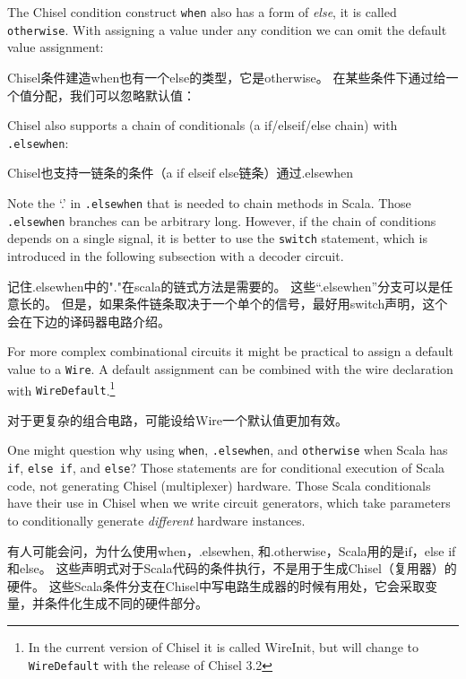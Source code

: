 \documentclass[%
    10pt,
    headinclude, footexclude,
    openright, %
    notitlepage,
    cleardoubleempty,
    headsepline,
    pointlessnumbers,
    bibtotoc, idxtotoc,
    ]{scrbook}
\newcommand{\code}[1]{{\small{\texttt{#1}}}}
\begin{document}
The Chisel condition construct \code{when} also has a form of \emph{else}, it is called
\code{otherwise}. With assigning a value under any condition we can omit the default
value assignment:

Chisel条件建造when也有一个else的类型，它是otherwise。
在某些条件下通过给一个值分配，我们可以忽略默认值：


Chisel also supports a chain of conditionals (a if/elseif/else chain) with \code{.elsewhen}:

Chisel也支持一链条的条件（a if elseif else链条）通过.elsewhen


Note the `.' in \code{.elsewhen} that is needed to chain methods in Scala.
Those \code{.elsewhen} branches can be arbitrary long.
However, if the chain of conditions depends on a single signal, it is better
to use the \code{switch} statement, which is introduced in the following
subsection with a decoder circuit.

记住.elsewhen中的"."在scala的链式方法是需要的。
这些“.elsewhen”分支可以是任意长的。
但是，如果条件链条取决于一个单个的信号，最好用switch声明，这个会在下边的译码器电路介绍。

For more complex combinational circuits it might be practical to assign
a default value to a \code{Wire}. A default assignment can be combined with the wire
declaration with \code{WireDefault}.\footnote{In the current version of Chisel
it is called WireInit, but will change to \code{WireDefault} with the release of Chisel 3.2}

对于更复杂的组合电路，可能设给Wire一个默认值更加有效。


One might question why using \code{when}, \code{.elsewhen}, and \code{otherwise}
when Scala has \code{if}, \code{else if}, and \code{else}? Those statements are for
conditional execution of Scala code, not generating Chisel (multiplexer) hardware.
Those Scala conditionals have their use in Chisel when we write circuit generators,
which take parameters to conditionally generate \emph{different} hardware instances.

有人可能会问，为什么使用when，.elsewhen, 和.otherwise，Scala用的是if，else if和else。
这些声明式对于Scala代码的条件执行，不是用于生成Chisel（复用器）的硬件。
这些Scala条件分支在Chisel中写电路生成器的时候有用处，它会采取变量，并条件化生成不同的硬件部分。
\end{document}

